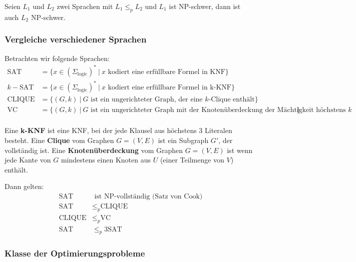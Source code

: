 \documentclass[11pt]{article}
\newcommand{\sat}{\text{SAT}}
\newcommand{\clique}{\text{CLIQUE}}
\newcommand{\vc}{\text{VC}}
\begin{document}
Seien $L_1$ und $L_2$ zwei Sprachen mit $L_1 \leq_p L_2$ und $L_1$ ist NP-schwer, dann ist auch $L_2$ NP-schwer.

\subsubsection{Vergleiche verschiedener Sprachen}

Betrachten wir folgende Sprachen:
\begin{equation*}
\begin{split}
	\sat & = \{x \in (\Sigma_\text{logic})^*\ |\ \text{$x$ kodiert eine erf{\"u}llbare Formel in KNF} \} \\
	k-\sat & = \{x \in (\Sigma_\text{logic})^*\ |\ \text{$x$ kodiert eine erf{\"u}llbare Formel in k-KNF} \} \\
	\clique & = \{(G,k)\ |\ \text{$G$ ist ein ungerichteter Graph, der eine $k$-Clique enth{\"a}lt} \} \\
	\vc & = \{(G,k)\ |\ \text{$G$ ist ein ungerichteter Graph mit der Knoten{\"u}berdeckung der M{\"a}chtigkeit h{\"o}chstens $k$} \} \\
\end{split}
\end{equation*}

Eine \textbf{k-KNF} ist eine KNF, bei der jede Klausel aus höchstens 3 Literalen besteht.
Eine \textbf{Clique} vom Graphen $G = (V,E)$ ist ein Subgraph $G'$, der vollst{\"a}ndig ist.
Eine \textbf{Knoten{\"u}berdeckung} vom Graphen $G = (V,E)$ ist wenn jede Kante von $G$ mindestens einen Knoten aus $U$ (einer Teilmenge von $V$) enth{\"a}lt.

Dann gelten:
\begin{equation*}
\begin{split}
	\sat & \text{ ist NP-vollst{\"a}ndig (Satz von Cook)} \\
	\sat & \leq_p \clique \\
	\clique & \leq_p \vc \\
	\sat & \leq_p 3\sat
\end{split}
\end{equation*}

\subsubsection{Klasse der Optimierungsprobleme}
\end{document}
